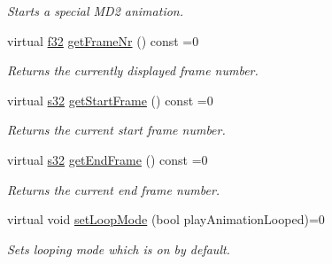 \begin{DoxyCompactItemize}
\begin{DoxyCompactList}\small\item\em Starts a special M\+D2 animation. \end{DoxyCompactList}\item 
\mbox{\label{classirr_1_1scene_1_1IAnimatedMeshSceneNode_abba274efec0cc98900518a86a150e09e}} 
virtual \hyperlink{namespaceirr_a0277be98d67dc26ff93b1a6a1d086b07}{f32} \hyperlink{classirr_1_1scene_1_1IAnimatedMeshSceneNode_abba274efec0cc98900518a86a150e09e}{get\+Frame\+Nr} () const =0
\begin{DoxyCompactList}\small\item\em Returns the currently displayed frame number. \end{DoxyCompactList}\item 
\mbox{\label{classirr_1_1scene_1_1IAnimatedMeshSceneNode_a103022e7383241ea5f1ed76c2deacc69}} 
virtual \hyperlink{namespaceirr_ac66849b7a6ed16e30ebede579f9b47c6}{s32} \hyperlink{classirr_1_1scene_1_1IAnimatedMeshSceneNode_a103022e7383241ea5f1ed76c2deacc69}{get\+Start\+Frame} () const =0
\begin{DoxyCompactList}\small\item\em Returns the current start frame number. \end{DoxyCompactList}\item 
\mbox{\label{classirr_1_1scene_1_1IAnimatedMeshSceneNode_a8c4f524c00b520e870881ca7abfdce5a}} 
virtual \hyperlink{namespaceirr_ac66849b7a6ed16e30ebede579f9b47c6}{s32} \hyperlink{classirr_1_1scene_1_1IAnimatedMeshSceneNode_a8c4f524c00b520e870881ca7abfdce5a}{get\+End\+Frame} () const =0
\begin{DoxyCompactList}\small\item\em Returns the current end frame number. \end{DoxyCompactList}\item 
virtual void \hyperlink{classirr_1_1scene_1_1IAnimatedMeshSceneNode_ae6cae051c74c3953061aa9e49e10cd06}{set\+Loop\+Mode} (bool play\+Animation\+Looped)=0
\begin{DoxyCompactList}\small\item\em Sets looping mode which is on by default. \end{DoxyCompactList}\item 

\end{DoxyCompactItemize}
